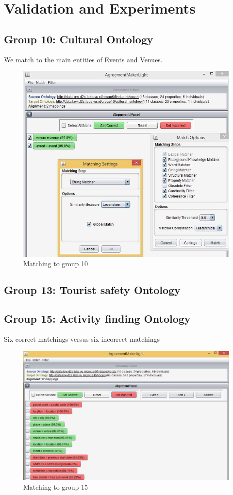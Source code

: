 \documentclass[runningheads,a4paper]{../../StyleFiles/llncs}
\begin{document}
\section{Validation and Experiments}

\subsection{Group 10: Cultural Ontology}
We match to the main entities of Events and Venues.

\begin{figure}[h]\centering
	\includegraphics[width=.75\textwidth]{img/match_g10.png}
	\caption{Matching to group 10}
	\label{fig:match_g10}
\end{figure}

\subsection{Group 13: Tourist safety Ontology}


\subsection{Group 15: Activity finding Ontology}
Six correct matchings versus six incorrect matchings

\begin{figure}[h]\centering
	\includegraphics[width=.75\textwidth]{img/match_g15.png}
	\caption{Matching to group 15}
	\label{fig:match_g15}
\end{figure}
\end{document}
